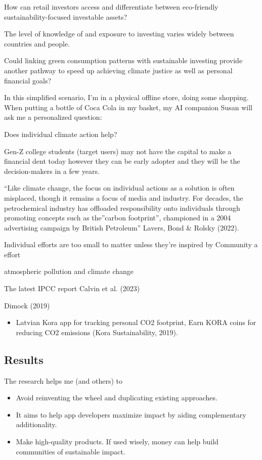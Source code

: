 \documentclass[
  letterpaper,
  DIV=11,
  numbers=noendperiod]{scrartcl}
\providecommand{\tightlist}{%
  \setlength{\itemsep}{0pt}\setlength{\parskip}{0pt}}\usepackage{longtable,booktabs,array}
\begin{document}
How can retail investors access and differentiate between eco-friendly
sustainability-focused investable assets?

The level of knowledge of and exposure to investing varies widely
between countries and people.

Could linking green consumption patterns with sustainable investing
provide another pathway to speed up achieving climate justice as well as
personal financial goals?

In this simplified scenario, I'm in a physical offline store, doing some
shopping. When putting a bottle of Coca Cola in my basket, my AI
companion Susan will ask me a personalized question:

Does individual climate action help?

Gen-Z college students (target users) may not have the capital to make a
financial dent today however they can be early adopter and they will be
the decision-makers in a few years.

``Like climate change, the focus on individual actions as a solution is
often misplaced, though it remains a focus of media and industry. For
decades, the petrochemical industry has offloaded responsibility onto
individuals through promoting concepts such as the''carbon footprint'',
championed in a 2004 advertising campaign by British Petroleum'' Lavers,
Bond \& Rolsky (2022).

Individual efforts are too small to matter unless they're inspired by
Community a effort

atmospheric pollution and climate change

The latest IPCC report Calvin et al. (2023)

Dimock (2019)

\begin{itemize}
\tightlist
\item
  Latvian Kora app for tracking personal CO2 footprint, Earn KORA coins
  for reducing CO2 emissions (Kora Sustainability, 2019).
\end{itemize}

\subsection{Results}\label{results-1}

The research helps me (and others) to

\begin{itemize}
\item
  Avoid reinventing the wheel and duplicating existing approaches.
\item
  It aims to help app developers maximize impact by aiding complementary
  additionality.
\item
  Make high-quality products. If used wisely, money can help build
  communities of sustainable impact.
\end{itemize}
\end{document}
